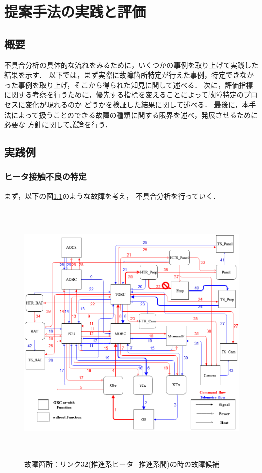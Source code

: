 \documentclass[11pt]{jsreport}
\begin{document}
\fi

\chapter{提案手法の実践と評価}

\section{概要}
不具合分析の具体的な流れをみるために，いくつかの事例を取り上げて実践した結果を示す．
以下では，まず実際に故障箇所特定が行えた事例，特定できなかった事例を取り上げ，そこから得られた知見に関して述べる．
次に，評価指標に関する考察を行うために，優先する指標を変えることによって故障特定のプロセスに変化が現れるのか
どうかを検証した結果に関して述べる．
最後に，本手法によって扱うことのできる故障の種類に関する限界を述べ，発展させるために必要な
方針に関して議論を行う．

\section{実践例}

\subsection{ヒータ接触不良の特定}
まず，以下の図\ref{fig:fault_mode1}のような故障を考え，
不具合分析を行っていく．\\
\begin{figure}[H]
   \centering
      \includegraphics[height=13.0cm]{figure/fault_mode1.png}
      \caption{故障箇所：リンク32(推進系ヒータ−推進系間)の時の故障候補}
      \label{fig:fault_mode1}
\end{figure}
\end{document}
